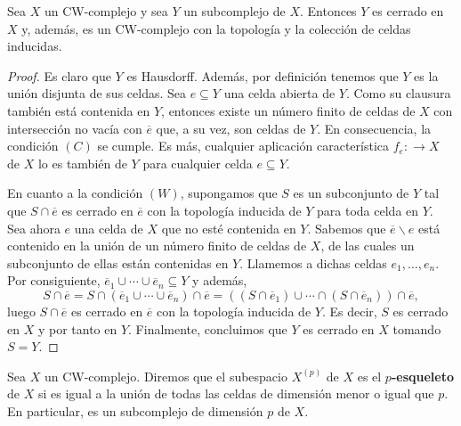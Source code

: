\begin{teorema}
	Sea $X$ un CW-complejo y sea $Y$ un subcomplejo de $X$. Entonces $Y$ es
	cerrado en $X$ y, además, es un CW-complejo con la topología y la colección de
	celdas inducidas.
\end{teorema}
\begin{proof}
	Es claro que $Y$ es Hausdorff. Además, por definición tenemos que $Y$ es la unión
	disjunta de sus celdas. Sea $e \subseteq Y$ una celda abierta de $Y$. Como su clausura
	también está contenida en $Y$, entonces existe un número finito de celdas de
	$X$ con intersección no vacía con $\overline{e}$ que, a su vez, son celdas de
	$Y$. En consecuencia, la condición $(C)$ se cumple. Es más, cualquier
	aplicación característica $f_{e}: \to X$ de $X$ lo es también de $Y$ para
	cualquier celda $e \subseteq Y$.
	
	En cuanto a la condición $(W)$, supongamos que $S$ es un subconjunto de $Y$ tal
	que $S \cap \overline{e}$ es cerrado en $\overline{e}$ con la topología inducida
	de $Y$ para toda celda en $Y$. Sea ahora $e$ una celda de $X$ que no esté
	contenida en $Y$. Sabemos que $\overline{e}\backslash e$ está contenido en la unión
	de un número finito de celdas de $X$, de las cuales un subconjunto de ellas
	están contenidas en $Y$. Llamemos a dichas celdas $e_{1}, \ldots, e_{n}$. Por
	consiguiente, $\overline{e}_{1}\cup \cdots \cup \overline{e}_{n}\subseteq Y$ y
	además,
	\[
	S \cap \overline{e}= S \cap (\overline{e}_{1}\cup \cdots \cup \overline{e}_{n}
	) \cap \overline{e}= \left( (S \cap \overline{e}_{1}) \cup \cdots \cap (S \cap
	\overline{e}_{n}) \right) \cap \overline{e},
	\]
	luego $S \cap \overline{e}$ es cerrado en $\overline{e}$ con la topología
	inducida de $Y$. Es decir, $S$ es cerrado en $X$ y por tanto en $Y$. Finalmente,
	concluimos que $Y$ es cerrado en $X$ tomando $S = Y$.
\end{proof}

\begin{definicion}
	Sea $X$ un CW-complejo. Diremos que el subespacio $X^{(p)}$ de $X$ es el
	\textbf{$p$-esqueleto} de $X$ si es igual a la unión de todas las celdas de dimensión
	menor o igual que $p$. En particular, es un subcomplejo de dimensión $p$ de $X$.
\end{definicion}

